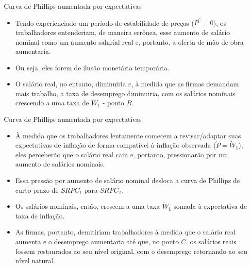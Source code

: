 \documentclass[10pt]{beamer}
\begin{document}
\begin{frame}{Curva de Phillips aumentada por expectativas}
    \begin{itemize}
        \item Tendo experienciado um período de estabilidade de preços ($\dot{P}^e = 0$), os trabalhadores entenderiam, de maneira errônea, esse aumento de salário nominal como um aumento salarial real e, portanto, a oferta de mão-de-obra aumentaria.
        \bigskip
        \item Ou seja, eles forem de ilusão monetária temporária.
        \bigskip
        \item O salário real, no entanto, diminuiria e, à medida que as firmas demandam mais trabalho, a taxa de desemprego diminuiria, com os salários nominais crescendo a uma taxa de $\dot{W}_1$ - ponto $B$.
    \end{itemize}    
\end{frame}

\begin{frame}{Curva de Phillips aumentada por expectativas}
    \begin{itemize}
        \item À medida que os trabalhadores lentamente comecem a revisar/adaptar suas expectativas de inflação de forma compatível à inflação observada ($\dot{P} = \dot{W}_1$), eles perceberão que o salário real caiu e, portanto, pressionarão por um aumento de salários nominais.
        \bigskip
        \item Essa pressão por aumento de salário nominal desloca a curva de Phillips de curto prazo de $SRPC_1$ para $SRPC_2$.
        \bigskip
        \item Os salários nominais, então, crescem a uma taxa $\dot{W}_1$ somada à expectativa de taxa de inflação.
        \bigskip
        \item As firmas, portanto, demitiriam trabalhadores à medida que o salário real aumenta e o desemprego aumentaria até que, no ponto $C$, os salários reais fossem restaurados ao seu nível original, com o desemprego retornando ao seu nível natural.
    \end{itemize}    
\end{frame}
\end{document}
